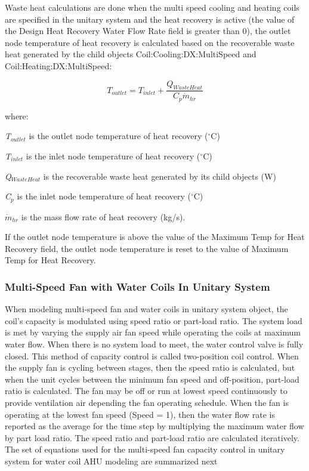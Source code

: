 Waste heat calculations are done when the multi speed cooling and heating coils are specified in the unitary system and the heat recovery is active (the value of the Design Heat Recovery Water Flow Rate field is greater than 0), the outlet node temperature of heat recovery is calculated based on the recoverable waste heat generated by the child objects Coil:Cooling:DX:MultiSpeed and Coil:Heating:DX:MultiSpeed:

\begin{equation}
{T_{outlet}} = {T_{inlet}} + \frac{{{Q_{WasteHeat}}}}{{{C_p}{{\dot m}_{hr}}}}
\end{equation}

where:

\emph{T\(_{outlet}\)} is the outlet node temperature of heat recovery (\(^{\circ}\)C)

\emph{T\(_{inlet}\)} is the inlet node temperature of heat recovery (\(^{\circ}\)C)

\emph{Q\(_{WasteHeat}\)} is the recoverable waste heat generated by its child objects (W)

\emph{C\(_{p}\)} is the inlet node temperature of heat recovery (\(^{\circ}\)C)

\({\dot m_{hr}}\) is the mass flow rate of heat recovery (kg/s).

If the outlet node temperature is above the value of the Maximum Temp for Heat Recovery field, the outlet node temperature is reset to the value of Maximum Temp for Heat Recovery.

\subsubsection{Multi-Speed Fan with Water Coils In Unitary System}\label{multi-speed-fan-with-water-coils-in-unitary-system}

When modeling multi-speed fan and water coils in unitary system object, the coil's capacity is modulated using speed ratio or part-load ratio. The system load is met by varying the supply air fan speed while operating the coils at maximum water flow. When there is no system load to meet, the water control valve is fully closed. This method of capacity control is called two-position coil control. When the supply fan is cycling between stages, then the speed ratio is calculated, but when the unit cycles between the minimum fan speed and off-position, part-load ratio is calculated. The fan may be off or run at lowest speed continuously to provide ventilation air depending the fan operating schedule. When the fan is operating at the lowest fan speed (Speed = 1), then the water flow rate is reported as the average for the time step by multiplying the maximum water flow by part load ratio. The speed ratio and part-load ratio are calculated iteratively. The set of equations used for the multi-speed fan capacity control in unitary system for water coil AHU modeling are summarized next

